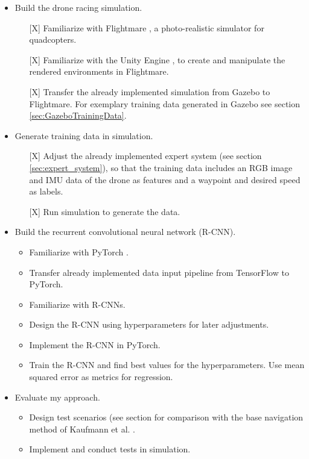 \begin{itemize}
	\item Build the drone racing simulation.
	\begin{itemize}
		\item[{[}X{]}] Familiarize with Flightmare \cite{song2020flightmare}, a photo-realistic simulator for quadcopters.
		\item[{[}X{]}] Familiarize with the Unity Engine \cite{Unity}, to create and manipulate the rendered environments in Flightmare.
		\item[{[}X{]}] Transfer the already implemented simulation from Gazebo \cite{Koenig2004} to Flightmare. For exemplary training data generated in Gazebo see section \ref{sec:GazeboTrainingData}.
	\end{itemize}
	\item Generate training data in simulation.
	\begin{itemize}
		\item[{[}X{]}] Adjust the already implemented expert system (see section \ref{sec:expert_system}), so that the training data includes
		an RGB image and IMU data of the drone as features and a waypoint and desired speed as labels.
		\item[{[}X{]}] Run simulation to generate the data.
	\end{itemize}
	\item Build the recurrent convolutional neural network (R-CNN).
	\begin{itemize}
		\item Familiarize with PyTorch \cite{NEURIPS2019_9015}.
		\item Transfer already implemented data input pipeline from TensorFlow \cite{tensorflow2015-whitepaper} to PyTorch.
		\item Familiarize with R-CNNs.
		\item Design the R-CNN using hyperparameters for later adjustments.
		\item Implement the R-CNN in PyTorch.
		\item Train the R-CNN and find best values for the hyperparameters. Use mean squared error as metrics for regression.
	\end{itemize}
	\item Evaluate my approach.
	\begin{itemize}
		\item Design test scenarios (see section for comparison with the base navigation method of Kaufmann et al. \cite{Kaufmann2018}.
		\item Implement and conduct tests in simulation. 

\end{itemize}
\end{itemize}
